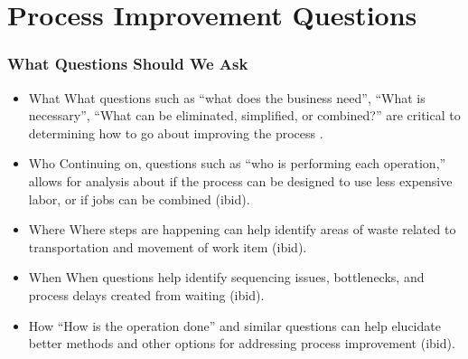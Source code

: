\section{Process Improvement Questions}
\begin{frame}
  \frametitle{What Questions Should We Ask}
  \begin{itemize}
    \item<1-> What
       {\scriptsize{What questions such as ``what does the business need'', ``What is necessary'', ``What can be eliminated, simplified, or combined?'' are critical to determining how to go about improving the process \parencite[][p. 119]{schroederOperationsManagementContemporary2010}.}}

    \item<2-> Who
       {\scriptsize{Continuing on, questions such as ``who is performing each operation,'' allows for analysis about if the process can be designed to use less expensive labor, or if jobs can be combined (ibid).}}

    \item<3-> Where
       {\scriptsize{Where steps are happening can help identify areas of waste related to transportation and movement of work item (ibid).}}

    \item<4-> When
       {\scriptsize{When questions help identify sequencing issues, bottlenecks, and process delays created from waiting (ibid).}}

    \item<5-> How
       {\scriptsize{``How is the operation done'' and similar questions can help elucidate better methods and other options for addressing process improvement (ibid).}}

  \end{itemize}
\end{frame}
